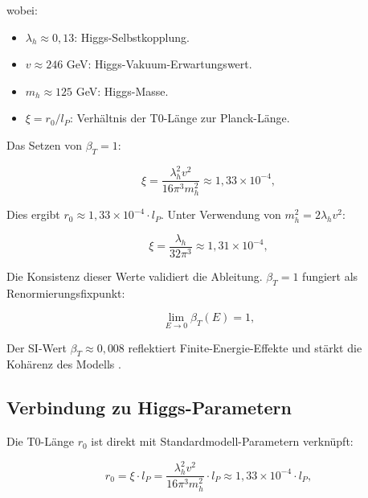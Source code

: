 \documentclass[twocolumn,aps,prl]{revtex4-2}
\begin{document}
{{{{{{{{{										wobei:
										\begin{itemize}
											\item \(\lambda_h \approx 0{,}13\): Higgs-Selbstkopplung.
											\item \(v \approx 246\) GeV: Higgs-Vakuum-Erwartungswert.
											\item \(m_h \approx 125\) GeV: Higgs-Masse.
											\item \(\xi = r_0/l_P\): Verhältnis der T0-Länge zur Planck-Länge.
										\end{itemize}
										
										Das Setzen von \(\beta_T = 1\):
										
										\begin{equation}
											\xi = \frac{\lambda_h^2 v^2}{16 \pi^3 m_h^2} \approx 1{,}33 \times 10^{-4}, \label{eq:xi_value}
										\end{equation}
										
										Dies ergibt \(r_0 \approx 1{,}33 \times 10^{-4} \cdot l_P\). Unter Verwendung von \(m_h^2 = 2 \lambda_h v^2\):
										
										\begin{equation}
											\xi = \frac{\lambda_h}{32 \pi^3} \approx 1{,}31 \times 10^{-4}, \label{eq:xi_alt}
										\end{equation}
										
										Die Konsistenz dieser Werte validiert die Ableitung. \(\beta_T = 1\) fungiert als Renormierungsfixpunkt:
										
										\begin{equation}
											\lim_{E \to 0} \beta_T(E) = 1, \label{eq:beta_limit}
										\end{equation}
										
										Der SI-Wert \(\beta_T \approx 0{,}008\) reflektiert Finite-Energie-Effekte und stärkt die Kohärenz des Modells \cite{pascher_beta_2025}.
										
										\subsection{Verbindung zu Higgs-Parametern}
										\label{subsec:higgs}
										
										Die T0-Länge \(r_0\) ist direkt mit Standardmodell-Parametern verknüpft:
										
										\begin{equation}
											r_0 = \xi \cdot l_P = \frac{\lambda_h^2 v^2}{16 \pi^3 m_h^2} \cdot l_P \approx 1{,}33 \times 10^{-4} \cdot l_P, \label{eq:r0_higgs}
										\end{equation}
										
}}}}}}}}}
\end{document}
